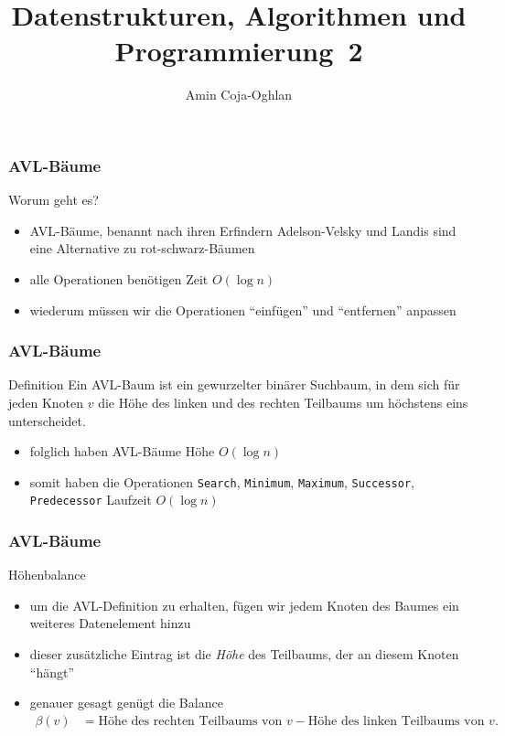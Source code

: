 \documentclass[aspectratio=1610, 11pt]{beamer}
\title{Datenstrukturen, Algorithmen und Programmierung~2}
\author[A.~Coja-Oghlan]{Amin Coja-Oghlan}
\institute[DAP2]{Lehrstuhl Informatik 2\\Fakult\"at f\"ur Informatik}
\newcommand{\mytitle}{AVL-B\"aume}
\begin{document}
\frame[plain]{\titlepage}

\begin{frame}\frametitle{\mytitle}
	\begin{exampleblock}{Worum geht es?}
		\begin{itemize}
			\item AVL-B\"aume, benannt nach ihren Erfindern Adelson-Velsky und Landis sind eine Alternative zu rot-schwarz-B\"aumen
			\item alle Operationen ben\"otigen Zeit $O(\log n)$
			\item wiederum m\"ussen wir die Operationen ``einf\"ugen'' und ``entfernen'' anpassen
		\end{itemize}
	\end{exampleblock}
\end{frame}

\begin{frame}\frametitle{\mytitle}
	\begin{block}{Definition}
		Ein AVL-Baum ist ein gewurzelter bin\"arer Suchbaum, in dem sich f\"ur jeden Knoten $v$ die H\"ohe des linken und des rechten Teilbaums um h\"ochstens eins unterscheidet.
	\end{block}
	\begin{exampleblock}{}
		\begin{itemize}
			\item folglich haben AVL-B\"aume H\"ohe $O(\log n)$
			\item somit haben die Operationen {\tt Search}, {\tt Minimum}, {\tt Maximum}, {\tt Successor}, {\tt Predecessor} Laufzeit $O(\log n)$
		\end{itemize}
	\end{exampleblock}
\end{frame}

\begin{frame}\frametitle{\mytitle}
	\begin{exampleblock}{H\"ohenbalance}
		\begin{itemize}
			\item um die AVL-Definition zu erhalten, f\"ugen wir jedem Knoten des Baumes ein weiteres Datenelement hinzu
			\item dieser zus\"atzliche Eintrag ist die {\em H\"ohe} des Teilbaums, der an diesem Knoten ``h\"angt''
			\item genauer gesagt gen\"ugt die \alert{Balance}
				\begin{align*}
					\beta(v)&=\mbox{H\"ohe des rechten Teilbaums von $v$}-\mbox{H\"ohe des linken Teilbaums von $v$}.
				\end{align*}
		\end{itemize}
	\end{exampleblock}
\end{frame}
\end{document}
